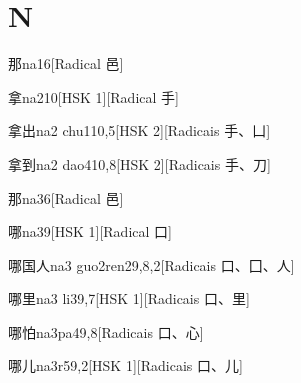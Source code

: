 
\section*{N}

\begin{entry}{那}{na1}{6}[Radical ⾢]
\end{entry}

\begin{entry}{拿}{na2}{10}[HSK 1][Radical ⼿]
\end{entry}

\begin{entry}{拿出}{na2 chu1}{10,5}[HSK 2][Radicais ⼿、⼐]
\end{entry}

\begin{entry}{拿到}{na2 dao4}{10,8}[HSK 2][Radicais ⼿、⼑]
\end{entry}

\begin{entry}{那}{na3}{6}[Radical ⾢]
\end{entry}

\begin{entry}{哪}{na3}{9}[HSK 1][Radical ⼝]
\end{entry}

\begin{entry}{哪国人}{na3 guo2ren2}{9,8,2}[Radicais ⼝、⼞、⼈]
\end{entry}

\begin{entry}{哪里}{na3 li3}{9,7}[HSK 1][Radicais ⼝、⾥]
\end{entry}

\begin{entry}{哪怕}{na3pa4}{9,8}[Radicais ⼝、⼼]
\end{entry}

\begin{entry}{哪儿}{na3r5}{9,2}[HSK 1][Radicais ⼝、⼉]
\end{entry}

